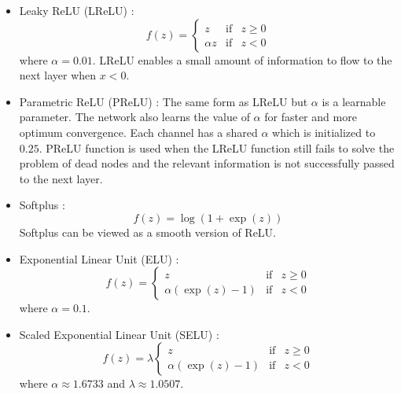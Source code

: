 \documentclass[12pt]{report}
\numberwithin{equation}{section}
\begin{document}
\begin{itemize}
\item Leaky ReLU (LReLU) {\cite{Maas2013}}:
\begin{equation}\label{eqn:lrelu}
f(z) = \left\{\begin{array}{lcr}
		z & \text{if} & z \geq 0 \\
		\alpha z & \text{if} & z < 0
		\end{array}\right.
\end{equation}
where $\alpha=0.01$. LReLU enables a small amount of information to flow to the next layer when $x < 0$.
\item Parametric ReLU (PReLU) {\cite{10.1109/ICCV.2015.123}}: The same form as LReLU but $\alpha$ is a learnable parameter. The network also learns the value of $\alpha$ for faster and more optimum convergence. Each channel has a shared $\alpha$ which is initialized to $0.25$.  PReLU function is used when the LReLU function still fails to solve the problem of dead nodes and the relevant information is not successfully passed to the next layer.
\item Softplus {\cite{10.5555/3104322.3104425}}: 
\begin{equation}
f(z) = \log(1 + \exp(z))
\end{equation}
Softplus can be viewed as a smooth version of ReLU.
\item Exponential Linear Unit (ELU) {\cite{Clevert2015FastAA}}:
\begin{equation}\label{eqn:elu}
f(z) = \left\{\begin{array}{lcr}
		z & \text{if} & z \geq 0 \\
		\alpha(\exp(z)-1) & \text{if} & z < 0
		\end{array}\right.
\end{equation}
where $\alpha=0.1$.
\item Scaled Exponential Linear Unit (SELU) {\cite{DBLP:journals/corr/KlambauerUMH17}}:
\begin{equation}\label{eqn:selu}
f(z) = \lambda\left\{\begin{array}{lcr}
		z & \text{if} & z \geq 0 \\
		\alpha(\exp(z)-1) & \text{if} & z < 0
		\end{array}\right.
\end{equation}
where $\alpha \approx 1.6733$ and $\lambda \approx 1.0507$.
\end{itemize}
\end{document}
